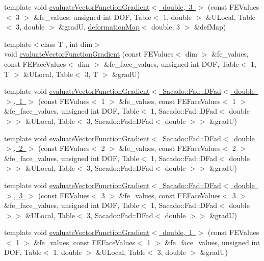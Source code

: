 \begin{DoxyCompactItemize}
\item 
template void \mbox{\hyperlink{function_evaluations_8cc_a05515d4765602312924bf90d040f146e}{evaluate\+Vector\+Function\+Gradient$<$ double, 3 $>$}} (const F\+E\+Values$<$ 3 $>$ \&fe\+\_\+values, unsigned int D\+OF, Table$<$ 1, double $>$ \&U\+Local, Table$<$ 3, double $>$ \&gradU, \mbox{\hyperlink{structdeformation_map}{deformation\+Map}}$<$ double, 3 $>$ \&def\+Map)
\item 
{\footnotesize template$<$class T , int dim$>$ }\\void \mbox{\hyperlink{group___evaluation_functions_gab2771d18ff704decbbc12ca2b848bbfe}{evaluate\+Vector\+Function\+Gradient}} (const F\+E\+Values$<$ dim $>$ \&fe\+\_\+values, const F\+E\+Face\+Values$<$ dim $>$ \&fe\+\_\+face\+\_\+values, unsigned int D\+OF, Table$<$ 1, T $>$ \&U\+Local, Table$<$ 3, T $>$ \&gradU)
\item 
template void \mbox{\hyperlink{function_evaluations_8cc_a0a0df4cf8cab669622b2a696651aca8b}{evaluate\+Vector\+Function\+Gradient$<$ Sacado\+::\+Fad\+::\+D\+Fad$<$ double $>$, 1 $>$}} (const F\+E\+Values$<$ 1 $>$ \&fe\+\_\+values, const F\+E\+Face\+Values$<$ 1 $>$ \&fe\+\_\+face\+\_\+values, unsigned int D\+OF, Table$<$ 1, Sacado\+::\+Fad\+::\+D\+Fad$<$ double $>$$>$ \&U\+Local, Table$<$ 3, Sacado\+::\+Fad\+::\+D\+Fad$<$ double $>$$>$ \&gradU)
\item 
template void \mbox{\hyperlink{function_evaluations_8cc_a955a54316c2cc8ddcd9c9d5b148d86ff}{evaluate\+Vector\+Function\+Gradient$<$ Sacado\+::\+Fad\+::\+D\+Fad$<$ double $>$, 2 $>$}} (const F\+E\+Values$<$ 2 $>$ \&fe\+\_\+values, const F\+E\+Face\+Values$<$ 2 $>$ \&fe\+\_\+face\+\_\+values, unsigned int D\+OF, Table$<$ 1, Sacado\+::\+Fad\+::\+D\+Fad$<$ double $>$$>$ \&U\+Local, Table$<$ 3, Sacado\+::\+Fad\+::\+D\+Fad$<$ double $>$$>$ \&gradU)
\item 
template void \mbox{\hyperlink{function_evaluations_8cc_af8f262e2bdb9eda799771e932e7bf340}{evaluate\+Vector\+Function\+Gradient$<$ Sacado\+::\+Fad\+::\+D\+Fad$<$ double $>$, 3 $>$}} (const F\+E\+Values$<$ 3 $>$ \&fe\+\_\+values, const F\+E\+Face\+Values$<$ 3 $>$ \&fe\+\_\+face\+\_\+values, unsigned int D\+OF, Table$<$ 1, Sacado\+::\+Fad\+::\+D\+Fad$<$ double $>$$>$ \&U\+Local, Table$<$ 3, Sacado\+::\+Fad\+::\+D\+Fad$<$ double $>$$>$ \&gradU)
\item 
template void \mbox{\hyperlink{function_evaluations_8cc_ac57e06f570eda3571e00912325612971}{evaluate\+Vector\+Function\+Gradient$<$ double, 1 $>$}} (const F\+E\+Values$<$ 1 $>$ \&fe\+\_\+values, const F\+E\+Face\+Values$<$ 1 $>$ \&fe\+\_\+face\+\_\+values, unsigned int D\+OF, Table$<$ 1, double $>$ \&U\+Local, Table$<$ 3, double $>$ \&gradU)

\end{DoxyCompactItemize}
